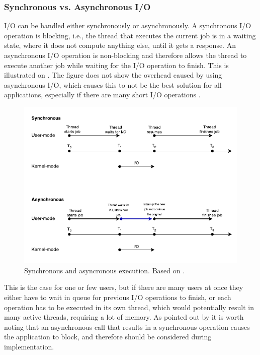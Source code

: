 \subsubsection{Synchronous vs. Asynchronous I/O}\label{subsubsec:sync}
I/O can be handled either synchronously or asynchronously. A synchronous I/O operation is blocking, i.e., the thread that executes the current job is in a waiting state, where it does not compute anything else, until it gets a response. An asynchronous I/O operation is non-blocking and therefore allows the thread to execute another job while waiting for the I/O operation to finish. This is illustrated on . The figure does not show the overhead caused by using asynchronous I/O, which causes this to not be the best solution for all applications, especially if there are many short I/O operations \cite{ms-syn-asyn}.

\begin{figure}[H]
  \centering
  \includegraphics[scale=1.2]{billeder/sync-async.pdf}  
  \caption{Synchronous and asyncronous execution. Based on \cite{ms-syn-asyn}.}
  \label{fig:syncasync}
\end{figure}

This is the case for one or few users, but if there are many users at once they either have to wait in queue for previous I/O operations to finish, or each operation has to be executed in its own thread, which would potentially result in many active threads, requiring a lot of memory.  As pointed out by \citet{amir} it is worth noting that an asynchronous call that results in a synchronous operation causes the application to block, and therefore should be considered during implementation.

